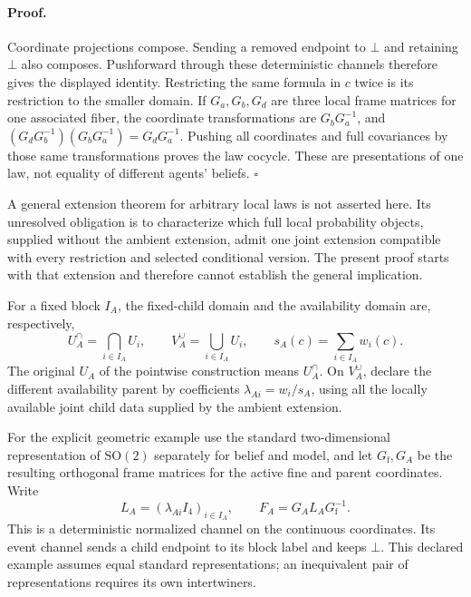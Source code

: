 \paragraph{Proof.}
Coordinate projections compose. Sending a removed endpoint to \(\bot\)
and retaining \(\bot\) also composes. Pushforward through these deterministic
channels therefore gives the displayed identity. Restricting the same
formula in \(c\) twice is its restriction to the smaller domain. If
\(G_a,G_b,G_d\) are three local frame matrices for one associated fiber,
the coordinate transformations are \(G_bG_a^{-1}\), and
\((G_dG_b^{-1})(G_bG_a^{-1})=G_dG_a^{-1}\). Pushing all coordinates and
full covariances by those same transformations proves the law cocycle.
These are presentations of one law, not equality of different agents'
beliefs. \(\square\)

A general extension theorem for arbitrary local laws is not asserted here.
Its unresolved obligation is to characterize which full local probability
objects, supplied without the ambient extension, admit one joint extension
compatible with every restriction and selected conditional version. The
present proof starts with that extension and therefore cannot establish the
general implication. 

For a fixed block \(I_A\), the fixed-child domain and the availability domain
are, respectively,
\begin{equation}
 U_A^{\cap}=\bigcap_{i\in I_A}U_i,\qquad
 V_A^{\cup}=\bigcup_{i\in I_A}U_i,
 \qquad s_A(c)=\sum_{i\in I_A}w_i(c).
\label{eq:rg-cover-parent-domains}
\end{equation}
The original \(U_A\) of the pointwise construction means
\(U_A^{\cap}\). On \(V_A^{\cup}\), declare the different availability
parent by coefficients \(\lambda_{Ai}=w_i/s_A\), using all the locally
available joint child data supplied by the ambient extension.

For the explicit geometric example use the standard two-dimensional
representation of \(\mathrm{SO}(2)\) separately for belief and model, and
let \(G_{\mathrm f},G_A\) be the resulting orthogonal frame matrices for
the active fine and parent coordinates. Write
\begin{equation}
 L_A=(\lambda_{Ai}I_4)_{i\in I_A},\qquad
 F_A=G_A L_A G_{\mathrm f}^{-1}.
\label{eq:rg-cover-parent-channel}
\end{equation}
This is a deterministic normalized channel on the continuous coordinates.
Its event channel sends a child endpoint to its block label and keeps
\(\bot\). This declared example assumes equal standard representations;
an inequivalent pair of representations requires its own intertwiners.


